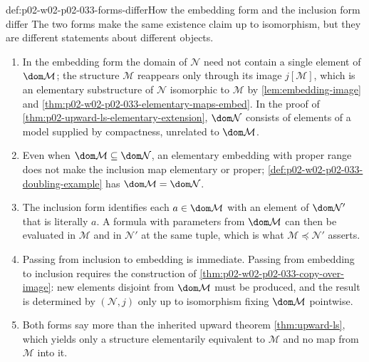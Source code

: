 \begin{hbwarning}{def:p02-w02-p02-033-forms-differ}{How the embedding form and the inclusion form differ}
The two forms make the same existence claim up to isomorphism, but they are
different statements about different objects.
\begin{enumerate}
  \item In the embedding form the domain of \(\mathcal N\) need not contain
        a single element of \(\dom\mathcal M\); the structure
        \(\mathcal M\) reappears only through its image
        \(j[\mathcal M]\), which is an elementary substructure of
        \(\mathcal N\) isomorphic to \(\mathcal M\) by
        \cref{lem:embedding-image} and
        \cref{thm:p02-w02-p02-033-elementary-maps-embed}.  In the proof of
        \cref{thm:p02-upward-ls-elementary-extension}, \(\dom\mathcal N\)
        consists of elements of a model supplied by compactness, unrelated
        to \(\dom\mathcal M\).
  \item Even when \(\dom\mathcal M\subseteq\dom\mathcal N\), an elementary
        embedding with proper range does not make the inclusion map
        elementary or proper; \cref{def:p02-w02-p02-033-doubling-example}
        has \(\dom\mathcal M=\dom\mathcal N\).
  \item The inclusion form identifies each \(a\in\dom\mathcal M\) with an
        element of \(\dom\mathcal N'\) that is literally \(a\).  A formula with
        parameters from \(\dom\mathcal M\) can then be evaluated in
        \(\mathcal M\) and in \(\mathcal N'\) at the same tuple, which is
        what \(\mathcal M\preccurlyeq\mathcal N'\) asserts.
  \item Passing from inclusion to embedding is immediate.  Passing from
        embedding to inclusion requires the construction of
        \cref{thm:p02-w02-p02-033-copy-over-image}: new elements disjoint
        from \(\dom\mathcal M\) must be produced, and the result is
        determined by \((\mathcal N,j)\) only up to isomorphism fixing
        \(\dom\mathcal M\) pointwise.
  \item Both forms say more than the inherited upward theorem
        \cref{thm:upward-ls}, which yields only a structure elementarily
        equivalent to \(\mathcal M\) and no map from \(\mathcal M\) into it.
\end{enumerate}
\end{hbwarning}


